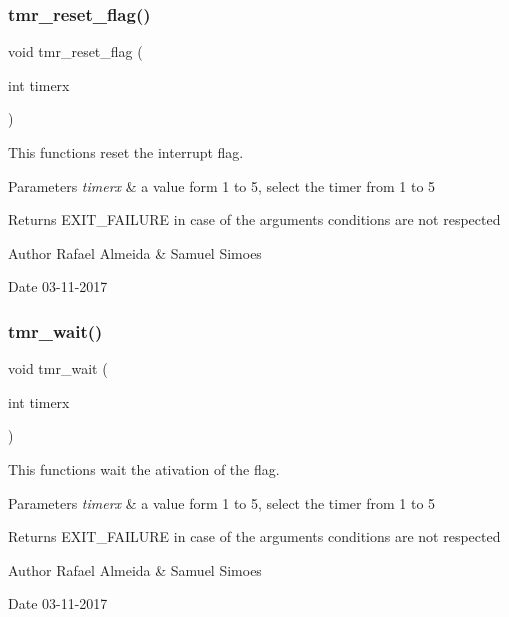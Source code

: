 \subsubsection{tmr\+\_\+reset\+\_\+flag()}
{\footnotesize\ttfamily void tmr\+\_\+reset\+\_\+flag (\begin{DoxyParamCaption}\item[{int}]{timerx }\end{DoxyParamCaption})}



This functions reset the interrupt flag. 


\begin{DoxyParams}{Parameters}
{\em timerx} & a value form 1 to 5, select the timer from 1 to 5 \\
\hline
\end{DoxyParams}
\begin{DoxyReturn}{Returns}
E\+X\+I\+T\+\_\+\+F\+A\+I\+L\+U\+RE in case of the argument\textquotesingle{}s conditions are not respected 
\end{DoxyReturn}
\begin{DoxyAuthor}{Author}
Rafael Almeida \& Samuel Simoes 
\end{DoxyAuthor}
\begin{DoxyDate}{Date}
03-\/11-\/2017 
\end{DoxyDate}
\mbox{\label{_timer__libs_8h_a303cd7354e05d6a9cb43021b28a37fc5}} 
\subsubsection{tmr\+\_\+wait()}
{\footnotesize\ttfamily void tmr\+\_\+wait (\begin{DoxyParamCaption}\item[{int}]{timerx }\end{DoxyParamCaption})}



This functions wait the ativation of the flag. 


\begin{DoxyParams}{Parameters}
{\em timerx} & a value form 1 to 5, select the timer from 1 to 5\\
\hline
\end{DoxyParams}
\begin{DoxyReturn}{Returns}
E\+X\+I\+T\+\_\+\+F\+A\+I\+L\+U\+RE in case of the argument\textquotesingle{}s conditions are not respected 
\end{DoxyReturn}
\begin{DoxyAuthor}{Author}
Rafael Almeida \& Samuel Simoes 
\end{DoxyAuthor}
\begin{DoxyDate}{Date}
03-\/11-\/2017 
\end{DoxyDate}
